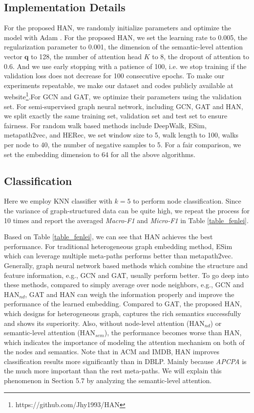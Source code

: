 \subsection{Implementation Details}
For the proposed HAN, we 
randomly initialize parameters
and optimize the 
model with Adam
\cite{adam}.
For the proposed HAN, we set the learning rate to 0.005, 
the regularization parameter to 0.001, the dimension of the semantic-level attention vector $\mathbf{q}$ to 128, the number of attention head $K$ to 8, the dropout of attention to 0.6.
And we use early stopping with a patience of 100, i.e. we stop training if the validation loss does not decrease for 100 consecutive epochs. To make our experiments repeatable, we make our dataset and codes publicly available at website\footnote{https://github.com/Jhy1993/HAN}.For GCN and GAT, we optimize their parameters using the validation set. 
For semi-supervised graph neural network, including GCN, GAT and HAN, we split exactly the same training set, validation set and test set to ensure fairness.
For random walk based methods include DeepWalk, ESim, metapath2vec, and HERec, 
we set window size to 5, walk length to 100, 
walks per node to 40, the number of negative samples to 5. For a fair comparison, we set the embedding dimension to 64 for all the above algorithms. 



\subsection{Classification}
Here we employ 
KNN classifier with ${k=5}$ to perform node classification. 
Since the variance of graph-structured data can be quite high, we repeat the process for 10 times and report the averaged \emph{Macro-F1} and \emph{Micro-F1} in Table \ref{table_fenlei}. 

Based on Table \ref{table_fenlei}, we can see that HAN achieves the best performance. 
For traditional heterogeneous graph embedding method, ESim which can leverage multiple meta-paths performs better than metapath2vec.
Generally, graph neural network based methods which combine the structure and feature information, e.g., GCN and GAT, usually perform better. 
To go deep into these methods, compared to simply average over node neighbors, e.g., GCN and HAN$_{nd}$, 
GAT and HAN can weigh the information properly and improve the performance of the learned embedding. 
Compared to GAT, the proposed HAN, which designs for heterogeneous graph, captures the rich semantics successfully and shows its superiority.
Also, without node-level attention (HAN$_{nd}$) or semantic-level attention (HAN$_{sem}$), 
the performance becomes worse than HAN, which indicates the importance of modeling the attention mechanism on both of the nodes and semantics. Note that in ACM and IMDB, HAN improves classification results more significantly than in DBLP. Mainly because \emph{APCPA} is the much more important than the rest meta-paths.
We will explain this phenomenon in Section 5.7 by analyzing the semantic-level attention.


